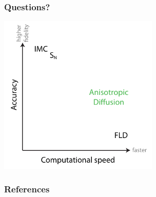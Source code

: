 \documentclass{beamer}
\begin{document}
\begin{frame}
  \frametitle{Questions?}
\begin{center}
  \includegraphics[width=3in]{../figures/fidelity2}
\end{center}
\end{frame}

\begin{frame}
  \frametitle{References}


\end{frame}

\end{document}
